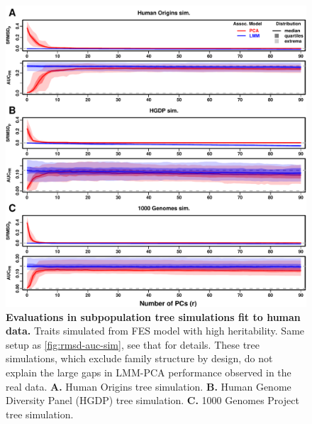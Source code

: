 \documentclass[11pt]{article}
\begin{document}
\begin{linenumbers}
\begin{figure}[hp]
  \centering
  \includegraphics[width=\textwidth,height=\textheight,keepaspectratio]{fes/rmsd-auc-real-sim.pdf}
  \caption{
    {\bf Evaluations in subpopulation tree simulations fit to human data.}
    Traits simulated from FES model with high heritability.
    Same setup as \cref{fig:rmsd-auc-sim}, see that for details.
    These tree simulations, which exclude family structure by design, do not explain the large gaps in LMM-PCA performance observed in the real data.
    \textbf{A.}
    Human Origins tree simulation.
    \textbf{B.}
    Human Genome Diversity Panel (HGDP) tree simulation.
    \textbf{C.}
    1000 Genomes Project tree simulation.
  }
  \label{fig:rmsd-auc-real-sim}
\end{figure}


\end{linenumbers}
\end{document}
